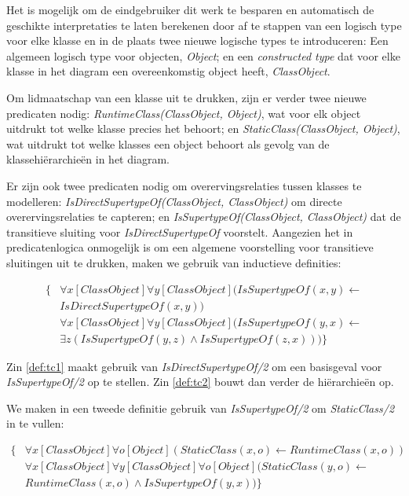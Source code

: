 Het is mogelijk om de eindgebruiker dit werk te besparen en automatisch de geschikte interpretaties te laten berekenen door af te stappen van een logisch type voor elke klasse en in de plaats twee nieuwe logische types te introduceren: Een algemeen logisch type voor objecten, \textit{Object}; en een \textit{constructed type}\cite{DeCatBroes2014PLaa} dat voor elke klasse in het diagram een overeenkomstig object heeft, \textit{ClassObject}.

Om lidmaatschap van een klasse uit te drukken, zijn er verder twee nieuwe predicaten nodig: \textit{RuntimeClass(ClassObject, Object)}, wat voor elk object uitdrukt tot welke klasse precies het behoort; en \textit{StaticClass(ClassObject, Object)}, wat uitdrukt tot welke klasses een object behoort als gevolg van de klassehi\"erarchie\"en in het diagram.

Er zijn ook twee predicaten nodig om overervingsrelaties tussen klasses te modelleren: \textit{IsDirectSupertypeOf(ClassObject, ClassObject)} om directe overervingsrelaties te capteren; en \textit{IsSupertypeOf(ClassObject, ClassObject)} dat de transitieve sluiting voor \textit{IsDirectSupertypeOf} voorstelt. Aangezien het in predicatenlogica onmogelijk is om een algemene voorstelling voor transitieve sluitingen uit te drukken, maken we gebruik van inductieve definities\cite{DeCatBroes2014PLaa}:

\begin{align}
\{
\nonumber &\forall{x}[ClassObject]\forall{y}[ClassObject](IsSupertypeOf(x,y) \leftarrow \\ &IsDirectSupertypeOf(x,y))\label{def:tc1} \\
\nonumber &\forall{x}[ClassObject]\forall{y}[ClassObject](IsSupertypeOf(y,x) \leftarrow \\
&\exists{z}(IsSupertypeOf(y,z) \land IsSupertypeOf(z,x)))\label{def:tc2}
\}
\end{align}

Zin \ref{def:tc1} maakt gebruik van \textit{IsDirectSupertypeOf/2} om een basisgeval voor \textit{IsSupertypeOf/2} op te stellen. Zin \ref{def:tc2} bouwt dan verder de hi\"erarchie\"en op.

We maken in een tweede definitie gebruik van \textit{IsSupertypeOf/2} om \textit{StaticClass/2} in te vullen:

\begin{align*}
\{
&\forall{x}[ClassObject]\forall{o}[Object](StaticClass(x,o) \leftarrow RuntimeClass(x,o)) \\
&\forall{x}[ClassObject]\forall{y}[ClassObject]\forall{o}[Object](StaticClass(y,o) \leftarrow \\ &RuntimeClass(x,o) \land IsSupertypeOf(y,x))
\}
\end{align*}

